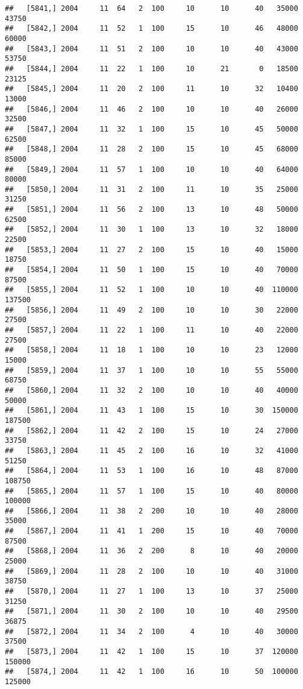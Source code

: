 \documentclass{article}\usepackage[]{graphicx}\usepackage[]{color}
\makeatletter
\newenvironment{kframe}{%
 \def\at@end@of@kframe{}%
 \ifinner\ifhmode%
  \def\at@end@of@kframe{\end{minipage}}%
  \begin{minipage}{\columnwidth}%
 \fi\fi%
 \def\FrameCommand##1{\hskip\@totalleftmargin \hskip-\fboxsep
 \colorbox{shadecolor}{##1}\hskip-\fboxsep
     \hskip-\linewidth \hskip-\@totalleftmargin \hskip\columnwidth}%
 \MakeFramed {\advance\hsize-\width
   \@totalleftmargin\z@ \linewidth\hsize
   \@setminipage}}%
 {\par\unskip\endMakeFramed%
 \at@end@of@kframe}
\newenvironment{knitrout}{}{} %
\makeatother
\begin{document}
\begin{knitrout}
\begin{kframe}
\begin{verbatim}
##   [5841,] 2004     11  64   2  100     10      10      40   35000   43750
##   [5842,] 2004     11  52   1  100     15      10      46   48000   60000
##   [5843,] 2004     11  51   2  100     10      10      40   43000   53750
##   [5844,] 2004     11  22   1  100     10      21       0   18500   23125
##   [5845,] 2004     11  20   2  100     11      10      32   10400   13000
##   [5846,] 2004     11  46   2  100     10      10      40   26000   32500
##   [5847,] 2004     11  32   1  100     15      10      45   50000   62500
##   [5848,] 2004     11  28   2  100     15      10      45   68000   85000
##   [5849,] 2004     11  57   1  100     10      10      40   64000   80000
##   [5850,] 2004     11  31   2  100     11      10      35   25000   31250
##   [5851,] 2004     11  56   2  100     13      10      48   50000   62500
##   [5852,] 2004     11  30   1  100     13      10      32   18000   22500
##   [5853,] 2004     11  27   2  100     15      10      40   15000   18750
##   [5854,] 2004     11  50   1  100     15      10      40   70000   87500
##   [5855,] 2004     11  52   1  100     10      10      40  110000  137500
##   [5856,] 2004     11  49   2  100     10      10      30   22000   27500
##   [5857,] 2004     11  22   1  100     11      10      40   22000   27500
##   [5858,] 2004     11  18   1  100     10      10      23   12000   15000
##   [5859,] 2004     11  37   1  100     10      10      55   55000   68750
##   [5860,] 2004     11  32   2  100     10      10      40   40000   50000
##   [5861,] 2004     11  43   1  100     15      10      30  150000  187500
##   [5862,] 2004     11  42   2  100     15      10      24   27000   33750
##   [5863,] 2004     11  45   2  100     16      10      32   41000   51250
##   [5864,] 2004     11  53   1  100     16      10      48   87000  108750
##   [5865,] 2004     11  57   1  100     15      10      40   80000  100000
##   [5866,] 2004     11  38   2  200     10      10      40   28000   35000
##   [5867,] 2004     11  41   1  200     15      10      40   70000   87500
##   [5868,] 2004     11  36   2  200      8      10      40   20000   25000
##   [5869,] 2004     11  28   2  100     10      10      40   31000   38750
##   [5870,] 2004     11  27   1  100     13      10      37   25000   31250
##   [5871,] 2004     11  30   2  100     10      10      40   29500   36875
##   [5872,] 2004     11  34   2  100      4      10      40   30000   37500
##   [5873,] 2004     11  42   1  100     15      10      37  120000  150000
##   [5874,] 2004     11  42   1  100     16      10      50  100000  125000

\end{verbatim}
\end{kframe}
\end{knitrout}
\end{document}
